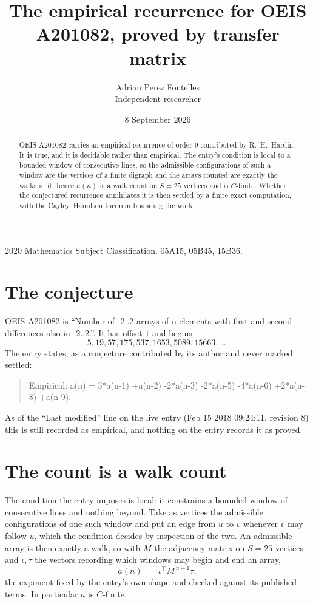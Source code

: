 \documentclass[11pt,a4paper]{article}
\title{The empirical recurrence for OEIS A201082, proved by transfer matrix}
\author{Adrian Perez Fontelles\\ \small Independent researcher}
\date{8 September 2026}
\theoremstyle{plain}
\theoremstyle{definition}
\begin{document}
\maketitle

\begin{abstract}
OEIS A201082 carries an empirical recurrence of order $9$ contributed by R.~H.~Hardin. It is
true, and it is decidable rather than empirical. The entry's condition is local to a bounded window of consecutive lines, so
the admissible configurations of such a window are the vertices of a finite digraph and the
arrays counted are exactly the walks in it; hence $a(n)$ is a walk count on $S=25$ vertices
and is $C$-finite. Whether the conjectured recurrence annihilates it is then settled by a
finite exact computation, with the Cayley--Hamilton theorem bounding the work.
\end{abstract}

\noindent\small 2020 Mathematics Subject Classification. 05A15, 05B45, 15B36.\normalsize

\section{The conjecture}

OEIS A201082 is ``Number of -2..2 arrays of n elements with first and second differences also in -2..2.''. It has offset $1$ and begins
\[
5, 19, 57, 175, 537, 1653, 5089, 15663,\ \dots
\]
The entry states, as a conjecture contributed by its author and never marked settled:
\begin{quote}
Empirical: a(n) = 3*a(n-1) +a(n-2) -2*a(n-3) -2*a(n-5) -4*a(n-6) +2*a(n-8) +a(n-9).
\end{quote}
As of the ``Last modified'' line on the live entry (Feb 15 2018 09:24:11, revision 8) this is still
recorded as empirical, and nothing on the entry records it as proved.

\section{The count is a walk count}

The condition the entry imposes is local: it constrains a bounded window of consecutive lines and nothing beyond. Take as
vertices the admissible configurations of one such window and put an edge from $u$ to $v$
whenever $v$ may follow $u$, which the condition decides by inspection of the two. An
admissible array is then exactly a walk, so with $M$ the adjacency matrix on $S=25$ vertices
and $\iota,\tau$ the vectors recording which windows may begin and end an array,
\[
a(n)\;=\;\iota^{\!\top}M^{\,n-1}\tau ,
\]
the exponent fixed by the entry's own shape and checked against its published terms. In
particular $a$ is $C$-finite.
\end{document}
